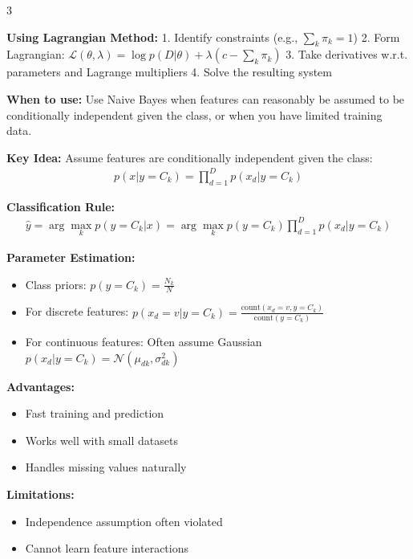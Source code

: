 \documentclass[10pt,landscape]{article}
\begin{document}
\begin{multicols}{3}
\begin{tcolorbox}[breakable, title=2.2 Generative Models for Classification, colback=classification]
\textbf{Using Lagrangian Method:}
1. Identify constraints (e.g., $\sum_{k}\pi_k = 1$)
2. Form Lagrangian: 
   $\mathcal{L}(\theta, \lambda) = \log p(D|\theta) + \lambda(c - \sum_{k}\pi_k)$
3. Take derivatives w.r.t. parameters and Lagrange multipliers
4. Solve the resulting system
\end{tcolorbox}

\begin{tcolorbox}[breakable, title=2.3 Naive Bayes, colback=classification]
\textbf{When to use:} Use Naive Bayes when features can reasonably be assumed to be conditionally independent given the class, or when you have limited training data.

\textbf{Key Idea:} Assume features are conditionally independent given the class:
\begin{align}
p(x|y=C_k) = \prod_{d=1}^D p(x_d|y=C_k)
\end{align}

\textbf{Classification Rule:}
\begin{align}
\hat{y} = \arg\max_k p(y=C_k|x) = \arg\max_k p(y=C_k)\prod_{d=1}^D p(x_d|y=C_k)
\end{align}

\textbf{Parameter Estimation:}
\begin{itemize}[leftmargin=*,noitemsep,topsep=0pt]
    \item Class priors: $p(y=C_k) = \frac{N_k}{N}$
    \item For discrete features: $p(x_d=v|y=C_k) = \frac{\text{count}(x_d=v, y=C_k)}{\text{count}(y=C_k)}$
    \item For continuous features: Often assume Gaussian $p(x_d|y=C_k) = \mathcal{N}(\mu_{dk}, \sigma_{dk}^2)$
\end{itemize}

\textbf{Advantages:}
\begin{itemize}[leftmargin=*,noitemsep,topsep=0pt]
    \item Fast training and prediction
    \item Works well with small datasets
    \item Handles missing values naturally
\end{itemize}

\textbf{Limitations:}
\begin{itemize}[leftmargin=*,noitemsep,topsep=0pt]
    \item Independence assumption often violated
    \item Cannot learn feature interactions
\end{itemize}
\end{tcolorbox}


\end{multicols}
\end{document}
